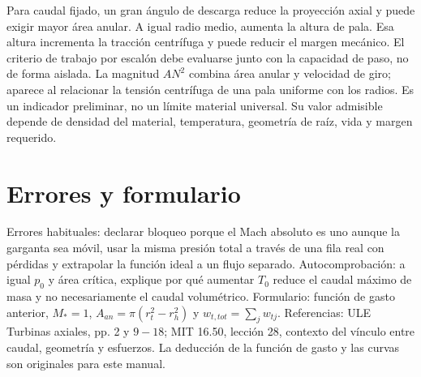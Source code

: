 \documentclass[10pt,openany]{book}
\begin{document}
Para caudal fijado, un gran ángulo de descarga reduce la proyección axial y puede exigir mayor área anular. A igual radio medio, aumenta la altura de pala. Esa altura incrementa la tracción centrífuga y puede reducir el margen mecánico. El criterio de trabajo por escalón debe evaluarse junto con la capacidad de paso, no de forma aislada.
La magnitud \(AN^2\) combina área anular y velocidad de giro; aparece al relacionar la tensión centrífuga de una pala uniforme con los radios. Es un indicador preliminar, no un límite material universal. Su valor admisible depende de densidad del material, temperatura, geometría de raíz, vida y margen requerido.

\section{Errores y formulario}

Errores habituales: declarar bloqueo porque el Mach absoluto es uno aunque la garganta sea móvil, usar la misma presión total a través de una fila real con pérdidas y extrapolar la función ideal a un flujo separado. Autocomprobación: a igual \(p_0\) y área crítica, explique por qué aumentar \(T_0\) reduce el caudal máximo de masa y no necesariamente el caudal volumétrico.
Formulario: función de gasto anterior, \(M_*=1\), \(A_{an}=\pi(r_t^2-r_h^2)\) y \(w_{t,tot}=\sum_jw_{tj}\). Referencias: ULE Turbinas axiales, pp. 2 y \(9-18\); MIT 16.50, lección 28, contexto del vínculo entre caudal, geometría y esfuerzos. La deducción de la función de gasto y las curvas son originales para este manual.
\end{document}
